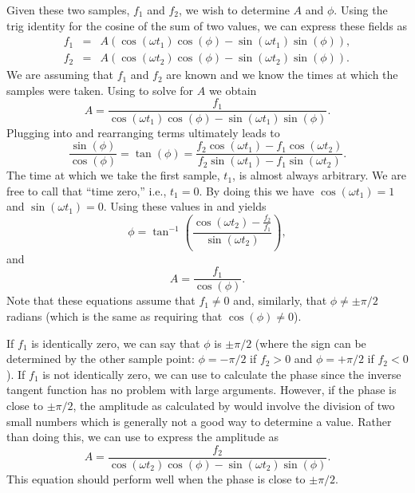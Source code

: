 Given these two samples, $f_1$ and $f_2$, we wish to determine $A$ and
$\phi$.  Using the trig identity for the cosine of the sum of two
values, we can express these fields as
\begin{eqnarray}
  f_1 & = & A (\cos(\omega t_1)\cos(\phi) - \sin(\omega t_1)\sin(\phi)),
  \label{eq:fieldSampleOne} \\
  f_2 & = & A (\cos(\omega t_2)\cos(\phi) - \sin(\omega t_2)\sin(\phi)).
  \label{eq:fieldSampleTwo}
\end{eqnarray}
We are assuming that $f_1$ and $f_2$ are known and we know the times
at which the samples were taken.  Using  to
solve for $A$ we obtain
\begin{equation}
  A = \frac{f_1}{\cos(\omega t_1)\cos(\phi) - \sin(\omega t_1)\sin(\phi)}.
  \label{eq:ampEqOne}
\end{equation}
Plugging  into  and
rearranging terms ultimately leads to
\begin{equation}
\frac{\sin(\phi)}{\cos(\phi)} = 
\tan(\phi) = \frac{f_2\cos(\omega t_1) - f_1\cos(\omega t_2)}
                  {f_2\sin(\omega t_1) - f_1\sin(\omega t_2)}.
  \label{eq:phaseEqOne}
\end{equation}
The time at which we take the first sample, $t_1$, is almost always
arbitrary.  We are free to call that ``time zero,'' i.e., $t_1=0$.  By
doing this we have $\cos(\omega t_1) = 1$ and $\sin(\omega t_1) = 0$.  
Using these values in  and 
yields
\begin{equation}
  \phi = \tan^{-1}\!
  \left(\frac{\cos(\omega t_2) - \frac{f_2}{f_1}}{\sin(\omega t_2)}\right),
  \label{eq:phaseEqTwo}
\end{equation}
and
\begin{equation}
   A = \frac{f_1}{\cos(\phi)}.
  \label{eq:ampEqTwo}
\end{equation}
Note that these equations assume that $f_1\neq 0$ and, similarly, that
$\phi\neq \pm\pi/2$ radians (which is the same as requiring that
$\cos(\phi)\neq 0$).

If $f_1$ is identically zero, we can say that $\phi$ is $\pm\pi/2$
(where the sign can be determined by the other sample point:
$\phi=-\pi/2$ if $f_2>0$ and $\phi=+\pi/2$ if $f_2<0$).  If $f_1$ is
not identically zero, we can use  to calculate
the phase since the inverse tangent function has no problem with large
arguments.  However, if the phase is close to $\pm\pi/2$, the
amplitude as calculated by  would involve the
division of two small numbers which is generally not a good way to
determine a value.  Rather than doing this, we can use
 to express the amplitude as
\begin{equation}
  A = \frac{f_2}{\cos(\omega t_2)\cos(\phi) - \sin(\omega t_2)\sin(\phi)}.
  \label{eq:ampEqThree}
\end{equation}
This equation should perform well when the phase is close to $\pm\pi/2$.

